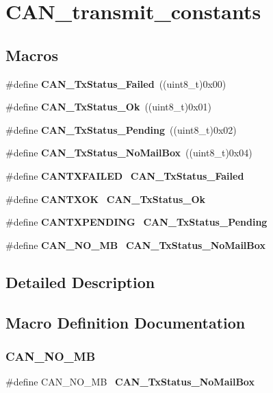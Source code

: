 \section{C\+A\+N\+\_\+transmit\+\_\+constants}
\label{group__CAN__transmit__constants}
\subsection*{Macros}
\begin{DoxyCompactItemize}
\item 
\#define \textbf{ C\+A\+N\+\_\+\+Tx\+Status\+\_\+\+Failed}~((uint8\+\_\+t)0x00)
\item 
\#define \textbf{ C\+A\+N\+\_\+\+Tx\+Status\+\_\+\+Ok}~((uint8\+\_\+t)0x01)
\item 
\#define \textbf{ C\+A\+N\+\_\+\+Tx\+Status\+\_\+\+Pending}~((uint8\+\_\+t)0x02)
\item 
\#define \textbf{ C\+A\+N\+\_\+\+Tx\+Status\+\_\+\+No\+Mail\+Box}~((uint8\+\_\+t)0x04)
\item 
\#define \textbf{ C\+A\+N\+T\+X\+F\+A\+I\+L\+ED}~\textbf{ C\+A\+N\+\_\+\+Tx\+Status\+\_\+\+Failed}
\item 
\#define \textbf{ C\+A\+N\+T\+X\+OK}~\textbf{ C\+A\+N\+\_\+\+Tx\+Status\+\_\+\+Ok}
\item 
\#define \textbf{ C\+A\+N\+T\+X\+P\+E\+N\+D\+I\+NG}~\textbf{ C\+A\+N\+\_\+\+Tx\+Status\+\_\+\+Pending}
\item 
\#define \textbf{ C\+A\+N\+\_\+\+N\+O\+\_\+\+MB}~\textbf{ C\+A\+N\+\_\+\+Tx\+Status\+\_\+\+No\+Mail\+Box}
\end{DoxyCompactItemize}


\subsection{Detailed Description}


\subsection{Macro Definition Documentation}
\mbox{\label{group__CAN__transmit__constants_ga418f1fd7ca2e852b263fd07874fde0c6}} 
\subsubsection{C\+A\+N\+\_\+\+N\+O\+\_\+\+MB}
{\footnotesize\ttfamily \#define C\+A\+N\+\_\+\+N\+O\+\_\+\+MB~\textbf{ C\+A\+N\+\_\+\+Tx\+Status\+\_\+\+No\+Mail\+Box}}



